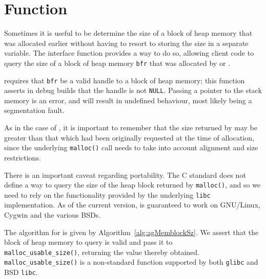 %
%
\section{Function \agMemblockSz}
\label{sec:agMemblockSz}


Sometimes it is useful to be determine the size of a block of heap memory that
was allocated earlier without having to resort to storing the size in a separate
variable. The interface function \agMemblockSz{} provides a way to do so, 
allowing client code to query the size of a block of heap memory \verb|bfr| that
was allocated by \agMemblockNew{} or \agMemblockCopy{}. 

\agMemblockSz{} requires that \verb|bfr| be a valid handle to a block of heap 
memory; this function asserts in debug builds that the handle is not 
\verb|NULL|. Passing a pointer to the stack memory is an error, and will result 
in undefined behaviour, most likely being a segmentation fault.

As in the case of \agMemblockNew{}, it is important to remember that the size
returned by \agMemblockSz{} may be greater than that which had been originally
requested at the time of allocation, since the underlying \verb|malloc()| call
needs to take into account alignment and size restrictions.


There is an important caveat regarding portability. The C standard does not
define a way to query the size of the heap block returned by \verb|malloc()|,
and so we need to rely on the functionality provided by the underlying
\verb|libc| implementation. As of the current version, \agMemblockSz{} is
guaranteed to work on GNU/Linux, Cygwin and the various BSDs.

The algorithm for \agMemblockSz{} is given by Algorithm\ \ref{alg:agMemblockSz}.
We assert that the block of heap memory to query is valid and pass it to \\
\texttt{malloc\_usable\_size()}, returning the value thereby obtained. \\
\verb|malloc_usable_size()| is a non-standard function supported by both
\verb|glibc| and BSD \verb|libc|.


